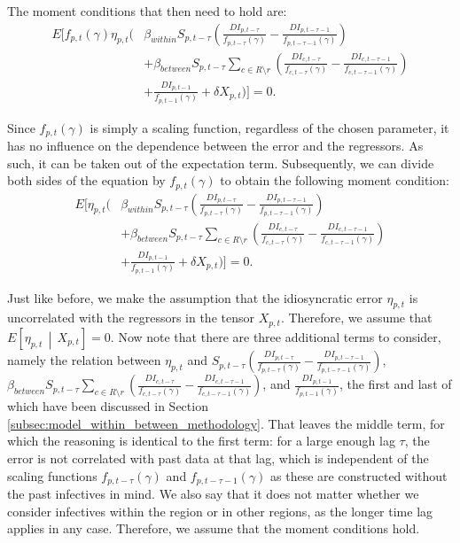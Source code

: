 \documentclass[12pt]{article}
\begin{document}
	The moment conditions that then need to hold are:
	    \begin{align*}
	        E\Bigg[ f_{p,t}(\gamma) \eta_{p,t}\Bigg( &\beta_{within}S_{p,t-\tau}\left(\frac{DI_{p,t-\tau}}{f_{p,t-\tau}(\gamma)} - \frac{DI_{p,t-\tau-1}}{f_{p,t-\tau-1}(\gamma)}\right) \\
	        &+ \beta_{between}S_{p,t-\tau} \sum_{c \in R \setminus r} \left(\frac{DI_{c,t-\tau}}{f_{c,t-\tau}(\gamma)} - \frac{DI_{c,t-\tau-1}}{f_{c,t-\tau-1}(\gamma)} \right) \\
	        &+ \frac{DI_{p,t-1}}{f_{p,t-1}(\gamma)} + \delta X_{p,t} \Bigg) \Bigg] = 0.
	    \end{align*}
	
	Since $f_{p,t}(\gamma)$ is simply a scaling function, regardless of the chosen parameter, it has no influence on the dependence between the error and the regressors. As such, it can be taken out of the expectation term. Subsequently, we can divide both sides of the equation by $f_{p,t}(\gamma)$ to obtain the following moment condition:
        \begin{align*}
    		E\Bigg[ \eta_{p,t}\Bigg( &\beta_{within}S_{p,t-\tau}\left(\frac{DI_{p,t-\tau}}{f_{p,t-\tau}(\gamma)} - \frac{DI_{p,t-\tau-1}}{f_{p,t-\tau-1}(\gamma)}\right) \\
	        &+ \beta_{between}S_{p,t-\tau} \sum_{c \in R \setminus r} \left(\frac{DI_{c,t-\tau}}{f_{c,t-\tau}(\gamma)} - \frac{DI_{c,t-\tau-1}}{f_{c,t-\tau-1}(\gamma)} \right) \\
	        &+ \frac{DI_{p,t-1}}{f_{p,t-1}(\gamma)} + \delta X_{p,t} \Bigg) \Bigg] = 0.
        \end{align*}
	
	Just like before, we make the assumption that the idiosyncratic error $\eta_{p,t}$ is uncorrelated with the regressors in the tensor $X_{p,t}$. Therefore, we assume that $E\left[\eta_{p,t} \,\middle|\, X_{p,t}\right] = 0$. Now note that there are three additional terms to consider, namely the relation between $\eta_{p,t}$ and $S_{p,t-\tau}\left(\frac{DI_{p,t-\tau}}{f_{p,t-\tau}(\gamma)} - \frac{DI_{p,t-\tau-1}}{f_{p,t-\tau-1}(\gamma)}\right)$, $\beta_{between}S_{p,t-\tau} \sum_{c \in R \setminus r} \left(\frac{DI_{c,t-\tau}}{f_{c,t-\tau}(\gamma)} - \frac{DI_{c,t-\tau-1}}{f_{c,t-\tau-1}(\gamma)} \right)$, and $\frac{DI_{p,t-1}}{f_{p,t-1}(\gamma)}$, the first and last of which have been discussed in Section \ref{subsec:model_within_between_methodology}. That leaves the middle term, for which the reasoning is identical to the first term: for a large enough lag $\tau$, the error is not correlated with past data at that lag, which is independent of the scaling functions $f_{p,t-\tau}(\gamma)$ and $f_{p,t-\tau-1}(\gamma)$ as these are constructed without the past infectives in mind. We also say that it does not matter whether we consider infectives within the region or in other regions, as the longer time lag applies in any case. Therefore, we assume that the moment conditions hold.
	
\end{document}
